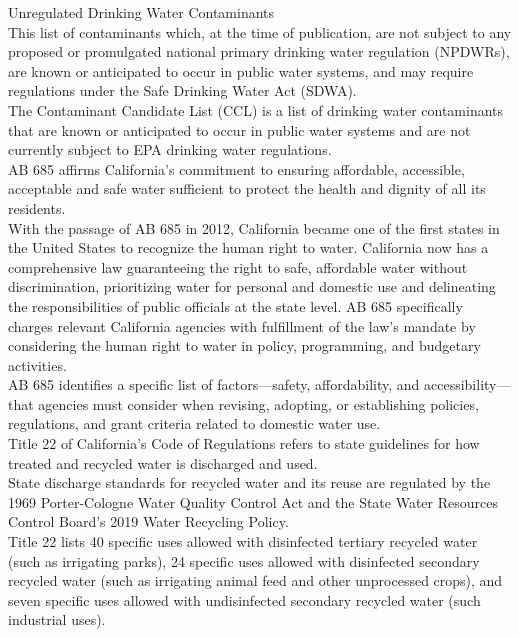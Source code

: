 \documentclass{article}
\begin{document}
Unregulated Drinking Water Contaminants\\
This list of contaminants which, at the time of publication, are not subject to any proposed or promulgated national primary drinking water regulation (NPDWRs), are known or anticipated to occur in public water systems, and may require regulations under the Safe Drinking Water Act (SDWA).\\

The Contaminant Candidate List (CCL) is a list of drinking water contaminants that are known or anticipated to occur in public water systems and are not currently subject to EPA drinking water regulations.\\



AB 685 affirms California’s commitment to ensuring affordable, accessible, acceptable and safe water sufficient to protect the health and
dignity of all its residents.\\

With the passage of AB 685 in 2012, California became one of the first states in the United States
to recognize the human right to water. California now has a comprehensive law guaranteeing the right
to safe, affordable water without discrimination, prioritizing water for personal and domestic use and
delineating the responsibilities of public officials at the state level. AB 685 specifically charges relevant
California agencies with fulfillment of the law’s mandate by considering the human right to water in
policy, programming, and budgetary activities.\\

AB 685 identifies a specific list
of factors—safety, affordability, and accessibility—that agencies must consider when revising,
adopting, or establishing policies, regulations, and
grant criteria related to domestic water use.\\




Title 22 of California’s Code of Regulations refers to state guidelines for how treated and recycled water is discharged and used.\\

State discharge standards for recycled water and its reuse are regulated by the 1969 Porter-Cologne Water Quality Control Act and the State Water Resources Control Board’s 2019 Water Recycling Policy.\\

Title 22 lists 40 specific uses allowed with disinfected tertiary recycled water (such as irrigating parks), 24 specific uses allowed with disinfected secondary recycled water (such as irrigating animal feed and other unprocessed crops), and seven specific uses allowed with undisinfected secondary recycled water (such industrial uses).\\
\end{document}
